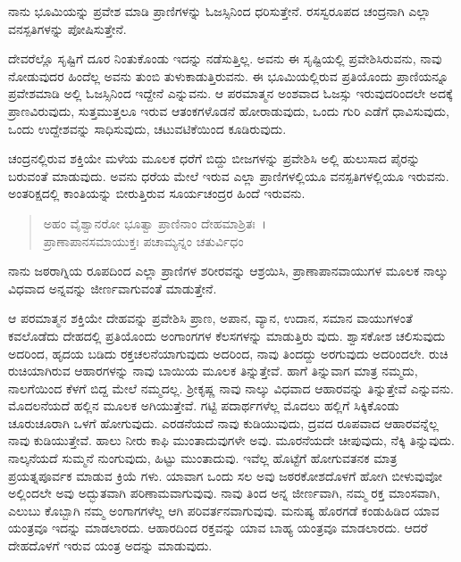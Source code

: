 {\small ನಾನು ಭೂಮಿಯನ್ನು ಪ್ರವೇಶ ಮಾಡಿ ಪ್ರಾಣಿಗಳನ್ನು ಓಜಸ್ಸಿನಿಂದ ಧರಿಸುತ್ತೇನೆ. ರಸಸ್ವರೂಪದ ಚಂದ್ರನಾಗಿ ಎಲ್ಲಾ ವನಸ್ಪತಿಗಳನ್ನು ಪೋಷಿಸುತ್ತೇನೆ.}

ದೇವರೆಲ್ಲೊ ಸೃಷ್ಟಿಗೆ ದೂರ ನಿಂತುಕೊಂಡು ಇದನ್ನು ನಡೆಸುತ್ತಿಲ್ಲ. ಅವನು ಈ ಸೃಷ್ಟಿಯಲ್ಲಿ ಪ್ರವೇಶಿಸಿರುವನು, ನಾವು ನೋಡುವುದರ ಹಿಂದೆಲ್ಲ ಅವನು ತುಂಬಿ ತುಳುಕಾಡುತ್ತಿರುವನು. ಈ ಭೂಮಿಯಲ್ಲಿರುವ ಪ್ರತಿಯೊಂದು ಪ್ರಾಣಿಯನ್ನೂ ಪ್ರವೇಶಮಾಡಿ ಅಲ್ಲಿ ಓಜಸ್ಸಿನಿಂದ ಇದ್ದೇನೆ ಎನ್ನುವನು. ಆ ಪರಮಾತ್ಮನ ಅಂಶವಾದ ಓಜಸ್ಸು ಇರುವುದರಿಂದಲೇ ಅದಕ್ಕೆ ಪ್ರಾಣವಿರುವುದು, ಸುತ್ತಮುತ್ತಲೂ ಇರುವ ಆತಂಕಗಳೊಡನೆ ಹೋರಾಡುವುದು, ಒಂದು ಗುರಿ ಎಡೆಗೆ ಧಾವಿಸುವುದು, ಒಂದು ಉದ್ದೇಶವನ್ನು ಸಾಧಿಸುವುದು, ಚಟುವಟಿಕೆಯಿಂದ ಕೂಡಿರುವುದು.

ಚಂದ್ರನಲ್ಲಿರುವ ಶಕ್ತಿಯೇ ಮಳೆಯ ಮೂಲಕ ಧರೆಗೆ ಬಿದ್ದು ಬೀಜಗಳನ್ನು ಪ್ರವೇಶಿಸಿ ಅಲ್ಲಿ ಹುಲುಸಾದ ಪೈರನ್ನು ಬರುವಂತೆ ಮಾಡುವುದು. ಅವನು ಧರೆಯ ಮೇಲೆ ಇರುವ ಎಲ್ಲಾ ಪ್ರಾಣಿಗಳಲ್ಲಿಯೂ ವನಸ್ಪತಿಗಳಲ್ಲಿಯೂ ಇರುವನು. ಅಂತರಿಕ್ಷದಲ್ಲಿ ಕಾಂತಿಯನ್ನು ಬೀರುತ್ತಿರುವ ಸೂರ್ಯಚಂದ್ರರ ಹಿಂದೆ ಇರುವನು.

\begin{verse}
ಅಹಂ ವೈಶ್ವಾನರೋ ಭೂತ್ವಾ ಪ್ರಾಣಿನಾಂ ದೇಹಮಾಶ್ರಿತಃ~।\\ಪ್ರಾಣಾಪಾನಸಮಾಯುಕ್ತಃ ಪಚಾಮ್ಯನ್ನಂ ಚತುರ್ವಿಧಂ 
\end{verse}

{\small ನಾನು ಜಠರಾಗ್ನಿಯ ರೂಪದಿಂದ ಎಲ್ಲಾ ಪ್ರಾಣಿಗಳ ಶರೀರವನ್ನು ಆಶ್ರಯಿಸಿ, ಪ್ರಾಣಾಪಾನವಾಯುಗಳ ಮೂಲಕ ನಾಲ್ಕು ವಿಧವಾದ ಅನ್ನವನ್ನು ಜೀರ್ಣವಾಗುವಂತೆ ಮಾಡುತ್ತೇನೆ.}

ಆ ಪರಮಾತ್ಮನ ಶಕ್ತಿಯೇ ದೇಹವನ್ನು ಪ್ರವೇಶಿಸಿ ಪ್ರಾಣ, ಅಪಾನ, ವ್ಯಾನ, ಉದಾನ, ಸಮಾನ ವಾಯುಗಳಂತೆ ಕವಲೊಡೆದು ದೇಹದಲ್ಲಿ ಪ್ರತಿಯೊಂದು ಅಂಗಾಂಗಗಳ ಕೆಲಸಗಳನ್ನು ಮಾಡುತ್ತಿರು ವುದು. ಶ್ವಾಸಕೋಶ ಚಲಿಸುವುದು ಅದರಿಂದ, ಹೃದಯ ಬಡಿದು ರಕ್ತಚಲನೆಯಾಗುವುದು ಅದರಿಂದ, ನಾವು ತಿಂದದ್ದು ಅರಗುವುದು ಅದರಿಂದಲೇ. ರುಚಿ ರುಚಿಯಾಗಿರುವ ಆಹಾರಗಳನ್ನು ನಾವು ಬಾಯಿಯ ಮೂಲಕ ತಿನ್ನುತ್ತೇವೆ. ಹಾಗೆ ತಿನ್ನುವಾಗ ಮಾತ್ರ ನಮ್ಮದು, ನಾಲಗೆಯಿಂದ ಕೆಳಗೆ ಬಿದ್ದ ಮೇಲೆ ನಮ್ಮದಲ್ಲ. ಶ‍್ರೀಕೃಷ್ಣ ನಾವು ನಾಲ್ಕು ವಿಧವಾದ ಆಹಾರವನ್ನು ತಿನ್ನುತ್ತೇವೆ ಎನ್ನುವನು. ಮೊದಲನೆಯದೆ ಹಲ್ಲಿನ ಮೂಲಕ ಅಗಿಯುತ್ತೇವೆ. ಗಟ್ಟಿ ಪದಾರ್ಥಗಳೆಲ್ಲ ಮೊದಲು ಹಲ್ಲಿಗೆ ಸಿಕ್ಕಿಕೊಂಡು ಚೂರುಚೂರಾಗಿ ಒಳಗೆ ಹೋಗುವುದು. ಎರಡನೆಯದೆ ನಾವು ಕುಡಿಯುವುದು, ದ್ರವದ ರೂಪವಾದ ಆಹಾರವನ್ನೆಲ್ಲ ನಾವು ಕುಡಿಯುತ್ತೇವೆ. ಹಾಲು ನೀರು ಕಾಫಿ ಮುಂತಾದುವುಗಳೇ ಅವು. ಮೂರನೆಯದೇ ಚೀಪುವುದು, ನೆಕ್ಕಿ ತಿನ್ನುವುದು. ನಾಲ್ಕನೆಯದೆ ಸುಮ್ಮನೆ ನುಂಗುವುದು, ಹಿಟ್ಟು ಮುಂತಾದುವು. ಇವೆಲ್ಲ ಹೊಟ್ಟೆಗೆ ಹೋಗುವತನಕ ಮಾತ್ರ ಪ್ರಯತ್ನಪೂರ್ವಕ ಮಾಡುವ ಕ್ರಿಯೆ ಗಳು. ಯಾವಾಗ ಒಂದು ಸಲ ಅವು ಜಠರಕೋಶದೊಳಗೆ ಹೋಗಿ ಬೀಳುವುವೋ ಅಲ್ಲಿಂದಲೇ ಅವು ಅದ್ಭುತವಾಗಿ ಪರಿಣಾಮವಾಗುವುವು. ನಾವು ತಿಂದ ಅನ್ನ ಜೀರ್ಣವಾಗಿ, ನಮ್ಮ ರಕ್ತ ಮಾಂಸವಾಗಿ, ಎಲುಬು ಕೊಬ್ಬಾಗಿ ನಮ್ಮ ಅಂಗಾಗಗಳೆಲ್ಲ ಆಗಿ ಪರಿವರ್ತನವಾಗುವುವು. ಮನುಷ್ಯ ಹೊರಗಡೆ ಕಂಡುಹಿಡಿದ ಯಾವ ಯಂತ್ರವೂ ಇದನ್ನು ಮಾಡಲಾರದು. ಆಹಾರದಿಂದ ರಕ್ತವನ್ನು ಯಾವ ಬಾಹ್ಯ ಯಂತ್ರವೂ ಮಾಡಲಾರದು. ಆದರೆ ದೇಹದೊಳಗೆ ಇರುವ ಯಂತ್ರ ಅದನ್ನು ಮಾಡುವುದು.


